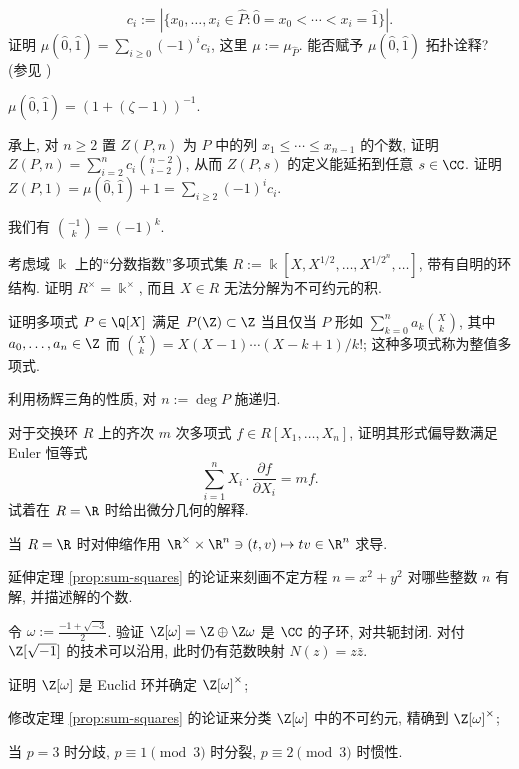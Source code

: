 \begin{Exercises}
		\[ c_i := \left| \{ x_0, \ldots, x_i \in \hat{P} : \hat{0} = x_0 < \cdots < x_i = \hat{1} \} \right|. \]
		证明 $\mu(\hat{0}, \hat{1}) = \sum_{i \geq 0} (-1)^i c_i$, 这里 $\mu := \mu_{\hat{P}}$. 能否赋予 $\mu(\hat{0}, \hat{1})$ 拓扑诠释? (参见 \cite[\S 3.8]{Stan09})
		\begin{hint}
			$\mu(\hat{0}, \hat{1}) = (1 + (\zeta - 1))^{-1}$.
		\end{hint}
	\item 承上, 对 $n \geq 2$ 置 $Z(P,n)$ 为 $P$ 中的列 $x_1 \leq \cdots \leq x_{n-1}$ 的个数, 证明 $Z(P,n) = \sum_{i=2}^n c_i \binom{n-2}{i-2}$, 从而 $Z(P,s)$ 的定义能延拓到任意 $s \in \CC$. 证明 $Z(P,1) = \mu(\hat{0},\hat{1}) + 1 = \sum_{i \geq 2} (-1)^i c_i$. \begin{hint} 我们有 $\binom{-1}{k} = (-1)^k$. \end{hint}
	\item 考虑域 $\Bbbk$ 上的``分数指数''多项式集 $R := \Bbbk[X, X^{1/2}, \ldots, X^{1/2^n}, \ldots]$, 带有自明的环结构. 证明 $R^\times = \Bbbk^\times$, 而且 $X \in R$ 无法分解为不可约元的积.
	\item 证明多项式 $P \in \Q[X]$ 满足 $P(\Z) \subset \Z$ 当且仅当 $P$ 形如 $\sum_{k=0}^n a_k \binom{X}{k}$, 其中 $a_0, \ldots, a_n \in \Z$ 而 $\binom{X}{k} = X(X-1) \cdots (X-k+1)/k!$; 这种多项式称为整值多项式. \begin{hint} 利用杨辉三角的性质, 对 $n := \deg P$ 施递归. \end{hint}
	\item 对于交换环 $R$ 上的齐次 $m$ 次多项式 $f \in R[X_1, \ldots, X_n]$, 证明其形式偏导数满足 Euler 恒等式
		\[ \sum_{i=1}^n X_i \cdot \frac{\partial f}{\partial X_i} = m f. \]
		试着在 $R=\R$ 时给出微分几何的解释. \begin{hint} 当 $R=\R$ 时对伸缩作用 $\R^\times \times \R^n \ni (t,v) \mapsto tv \in \R^n$ 求导. \end{hint}
	\item 延伸定理 \ref{prop:sum-squares} 的论证来刻画不定方程 $n = x^2 + y^2$ 对哪些整数 $n$ 有解, 并描述解的个数.
	\item 令 $\omega := \frac{-1 + \sqrt{-3}}{2}$. 验证 $\Z[\omega] = \Z \oplus \Z\omega$ 是 $\CC$ 的子环, 对共轭封闭. 对付 $\Z[\sqrt{-1}]$ 的技术可以沿用, 此时仍有范数映射 $N(z) = z\bar{z}$.
		\begin{compactenum}[(i)]
			\item 证明 $\Z[\omega]$ 是 Euclid 环并确定 $\Z[\omega]^\times$;
			\item 修改定理 \ref{prop:sum-squares} 的论证来分类 $\Z[\omega]$ 中的不可约元, 精确到 $\Z[\omega]^\times$; \begin{hint} 当 $p=3$ 时分歧, $p \equiv 1 \pmod 3$ 时分裂, $p \equiv 2 \pmod 3$ 时惯性. \end{hint}

\end{compactenum}
\end{Exercises}
